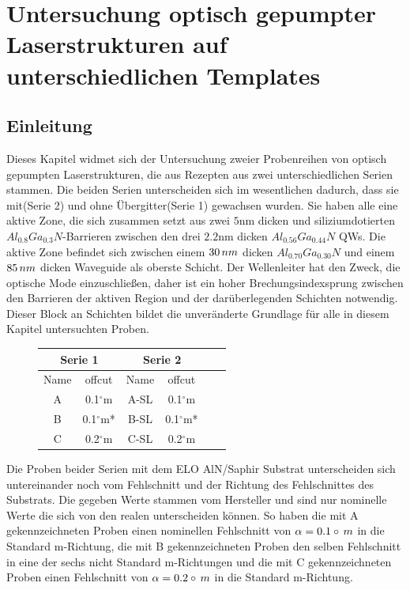 
\thispagestyle{fancy}
\justifying
\chapter{Untersuchung optisch gepumpter Laserstrukturen auf unterschiedlichen Templates}
\label{chap:offcut}

\section{Einleitung}
Dieses Kapitel widmet sich der Untersuchung zweier Probenreihen von optisch gepumpten Laserstrukturen, die aus Rezepten aus zwei unterschiedlichen Serien stammen. Die beiden Serien unterscheiden sich im wesentlichen dadurch, dass sie mit(Serie 2) und ohne Übergitter(Serie 1) gewachsen wurden. Sie haben alle eine aktive Zone, die sich zusammen setzt aus zwei $5$nm dicken und siliziumdotierten $ Al_{0.8}Ga_{0.3}N$-Barrieren zwischen den drei $2.2$nm dicken $ Al_{0.56}Ga_{0.44}N$ QWs. Die aktive Zone befindet sich zwischen einem $30 \thinspace nm$ dicken $ Al_{0.70}Ga_{0.30}N$ und einem $85 \thinspace nm$ dicken Waveguide als oberste Schicht. Der Wellenleiter hat den Zweck, die optische Mode einzuschließen, daher ist ein hoher Brechungsindexsprung zwischen den Barrieren der aktiven Region und der darüberlegenden Schichten notwendig.
Dieser Block an Schichten bildet die unveränderte Grundlage für alle in diesem Kapitel untersuchten Proben.
\begin{figure}[H]
\centering
\begin{tabular}{ |c|c|c|c|c|c|   }
\hline
\multicolumn{2}{|c|}{Serie 1} & \multicolumn{2}{c|}{Serie 2}  \\
\hline
Name & offcut&  Name & offcut  \\
\hline
A & 0.1$^\circ$m  & A-SL & 0.1$^\circ$m \\
B & 0.1$^\circ$m* & B-SL & 0.1$^\circ$m* \\
C & 0.2$^\circ$m  & C-SL & 0.2$^\circ$m \\
\hline
\end{tabular}
\end{figure}
\noindent 
Die Proben beider Serien mit dem ELO AlN/Saphir Substrat unterscheiden sich untereinander noch vom Fehlschnitt und der Richtung des Fehlschnittes des Substrats. Die gegeben Werte stammen vom Hersteller und sind nur nominelle Werte die sich von den realen unterscheiden können. So haben die mit A gekennzeichneten Proben einen nominellen Fehlschnitt von $\alpha = 0.1\circ \thinspace m$ in die Standard m-Richtung, die mit B gekennzeichneten Proben den selben Fehlschnitt in eine der sechs nicht Standard m-Richtungen und die mit C gekennzeichneten Proben einen Fehlschnitt von $\alpha = 0.2\circ \thinspace m$ in die Standard m-Richtung. 
